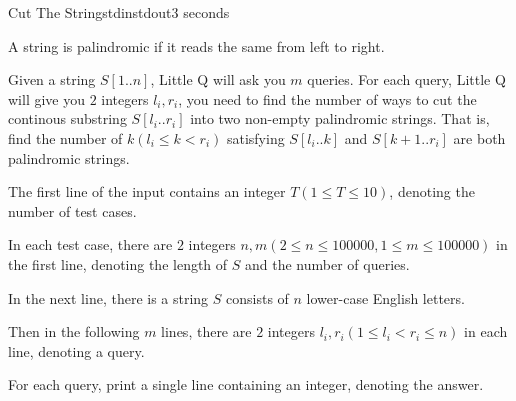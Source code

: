 \documentclass[11pt,a4paper,oneside]{article}
\newcommand{\timeLimit}{2 seconds}
\renewcommand{\defaultmemorylimit}{512 megabytes}
\begin{document}
\renewcommand{\timeLimit}{3 seconds}
\renewcommand{\defaultmemorylimit}{512 megabytes}
\begin{problem}{Cut The String}{stdin}{stdout}{\timeLimit}

A string is palindromic if it reads the same from left to right.\par
Given a string $S[1..n]$, Little Q will ask you $m$ queries. For each query, Little Q will give you $2$ integers $l_i,r_i$, you need to find the number of ways to cut the continous substring $S[l_i..r_i]$ into two non-empty palindromic strings. That is, find the number of $k(l_i\leq k<r_i)$ satisfying $S[l_i..k]$ and $S[k+1..r_i]$ are both palindromic strings.

\InputFile
The first line of the input contains an integer $T(1\leq T\leq10)$, denoting the number of test cases.\par
In each test case, there are $2$ integers $n,m(2\leq n\leq 100000,1\leq m\leq 100000)$ in the first line, denoting the length of $S$ and the number of queries.\par
In the next line, there is a string $S$ consists of $n$ lower-case English letters.\par
Then in the following $m$ lines, there are $2$ integers $l_i,r_i(1\leq l_i<r_i\leq n)$ in each line, denoting a query.

\OutputFile
For each query, print a single line containing an integer, denoting the answer.

\Examples
\begin{example}
%
\end{example}
\end{problem}
\renewcommand{\timeLimit}{4 seconds}
\renewcommand{\defaultmemorylimit}{512 megabytes}
\end{document}
